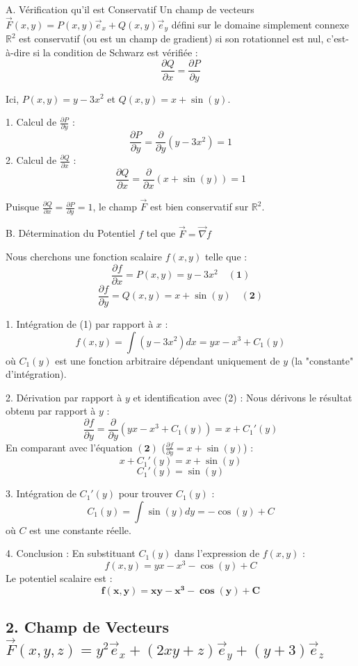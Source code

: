 \documentclass[french]{yLectureNote}
\renewcommand{\vec}{\overrightarrow}
\begin{document}
A. Vérification qu'il est Conservatif
Un champ de vecteurs $\vec{F}(x,y) = P(x,y)\vec{e}_{x} + Q(x,y)\vec{e}_{y}$ défini sur le domaine simplement connexe $\mathbb{R}^2$ est conservatif (ou est un champ de gradient) si son rotationnel est nul, c'est-à-dire si la condition de Schwarz est vérifiée :
$$
\frac{\partial Q}{\partial x} = \frac{\partial P}{\partial y}
$$

Ici, $P(x,y) = y-3x^2$ et $Q(x,y) = x+\sin(y)$.

1.  Calcul de $\frac{\partial P}{\partial y}$ :
    $$
    \frac{\partial P}{\partial y} = \frac{\partial}{\partial y}(y-3x^2) = 1
    $$
2.  Calcul de $\frac{\partial Q}{\partial x}$ :
    $$
    \frac{\partial Q}{\partial x} = \frac{\partial}{\partial x}(x+\sin(y)) = 1
    $$

Puisque $\frac{\partial Q}{\partial x} = \frac{\partial P}{\partial y} = 1$, le champ $\vec{F}$ est bien conservatif sur $\mathbb{R}^2$.

B. Détermination du Potentiel $f$ tel que $\vec{F} = \vec{\nabla}f$

Nous cherchons une fonction scalaire $f(x,y)$ telle que :
$$
\frac{\partial f}{\partial x} = P(x,y) = y-3x^2 \quad \mathbf{(1)}
$$
$$
\frac{\partial f}{\partial y} = Q(x,y) = x+\sin(y) \quad \mathbf{(2)}
$$

1.  Intégration de (1) par rapport à $x$ :
    $$
    f(x,y) = \int (y-3x^2) dx = yx - x^3 + C_1(y)
    $$
    où $C_1(y)$ est une fonction arbitraire dépendant uniquement de $y$ (la "constante" d'intégration).

2.  Dérivation par rapport à $y$ et identification avec (2) :
    Nous dérivons le résultat obtenu par rapport à $y$ :
    $$
    \frac{\partial f}{\partial y} = \frac{\partial}{\partial y}(yx - x^3 + C_1(y)) = x + C_1'(y)
    $$
    En comparant avec l'équation $\mathbf{(2)}$ ($\frac{\partial f}{\partial y} = x+\sin(y)$) :
    $$
    x + C_1'(y) = x + \sin(y)
    $$
    $$
    C_1'(y) = \sin(y)
    $$

3.  Intégration de $C_1'(y)$ pour trouver $C_1(y)$ :
    $$
    C_1(y) = \int \sin(y) dy = -\cos(y) + C
    $$
    où $C$ est une constante réelle.

4.  Conclusion :
    En substituant $C_1(y)$ dans l'expression de $f(x,y)$ :
    $$
    f(x,y) = yx - x^3 - \cos(y) + C
    $$
    Le potentiel scalaire est :
    $$
    \mathbf{f(x,y) = xy - x^3 - \cos(y) + C}
    $$

\subsection{2. Champ de Vecteurs $\vec{F}(x,y,z)=y^2\vec{e}_{x}+(2xy+z)\vec{e}_{y}+(y+3)\vec{e}_{z}$}
\end{document}

